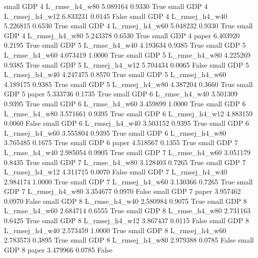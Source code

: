      small      GDP                 4  L_rmse_h4_w80   5.089164      0.9330    True
     small      GDP                 4 L_rmsej_h4_w12   6.833231      0.0145   False
     small      GDP                 4 L_rmsej_h4_w40   5.226815      0.6530    True
     small      GDP                 4 L_rmsej_h4_w60   5.048232      0.9330    True
     small      GDP                 4 L_rmsej_h4_w80   5.243378      0.6530    True
     small      GDP                 4          paper   6.403920      0.2195    True
     small      GDP                 5  L_rmse_h4_w40   4.193634      0.9385    True
     small      GDP                 5  L_rmse_h4_w60   4.073419      1.0000    True
     small      GDP                 5  L_rmse_h4_w80   4.225269      0.9385    True
     small      GDP                 5 L_rmsej_h4_w12   5.704434      0.0065   False
     small      GDP                 5 L_rmsej_h4_w40   4.247475      0.8570    True
     small      GDP                 5 L_rmsej_h4_w60   4.189175      0.9385    True
     small      GDP                 5 L_rmsej_h4_w80   4.387204      0.3660    True
     small      GDP                 5          paper   5.333736      0.1735    True
     small      GDP                 6  L_rmse_h4_w40   3.501309      0.9395    True
     small      GDP                 6  L_rmse_h4_w60   3.459899      1.0000    True
     small      GDP                 6  L_rmse_h4_w80   3.571661      0.9395    True
     small      GDP                 6 L_rmsej_h4_w12   4.883159      0.0060   False
     small      GDP                 6 L_rmsej_h4_w40   3.503152      0.9395    True
     small      GDP                 6 L_rmsej_h4_w60   3.555804      0.9395    True
     small      GDP                 6 L_rmsej_h4_w80   3.765485      0.1675    True
     small      GDP                 6          paper   4.518567      0.1355    True
     small      GDP                 7  L_rmse_h4_w40   2.985054      0.9905    True
     small      GDP                 7  L_rmse_h4_w60   3.051179      0.8435    True
     small      GDP                 7  L_rmse_h4_w80   3.128403      0.7265    True
     small      GDP                 7 L_rmsej_h4_w12   4.311715      0.0070   False
     small      GDP                 7 L_rmsej_h4_w40   2.984174      1.0000    True
     small      GDP                 7 L_rmsej_h4_w60   3.130366      0.7265    True
     small      GDP                 7 L_rmsej_h4_w80   3.354677      0.0970   False
     small      GDP                 7          paper   3.957462      0.0970   False
     small      GDP                 8  L_rmse_h4_w40   2.580984      0.9075    True
     small      GDP                 8  L_rmse_h4_w60   2.684714      0.6555    True
     small      GDP                 8  L_rmse_h4_w80   2.731163      0.6425    True
     small      GDP                 8 L_rmsej_h4_w12   3.867437      0.0115   False
     small      GDP                 8 L_rmsej_h4_w40   2.573459      1.0000    True
     small      GDP                 8 L_rmsej_h4_w60   2.783573      0.3895    True
     small      GDP                 8 L_rmsej_h4_w80   2.979388      0.0785   False
     small      GDP                 8          paper   3.479966      0.0785   False